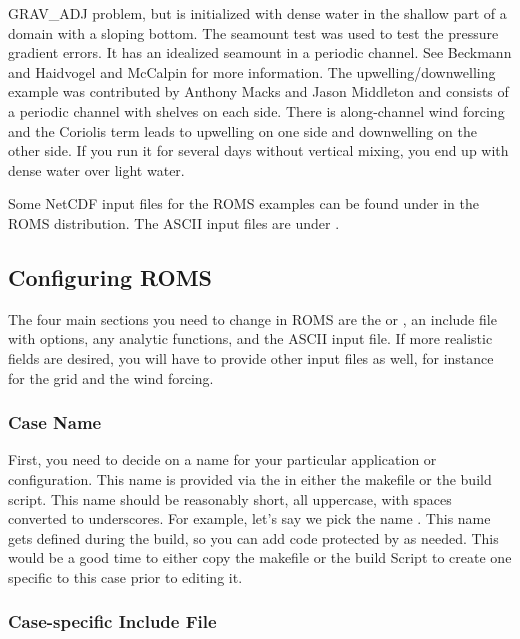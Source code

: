 \begin{klist}
 GRAV\_ADJ problem, but is initialized with dense water in the shallow
part of a domain with a sloping bottom.
      The seamount test was used to test the pressure
 gradient errors.  It has an idealized seamount in a periodic channel.
 See Beckmann and Haidvogel \cite{BH93} and McCalpin \cite{McCalpin94}
 for more information.
     The upwelling/downwelling example was
 contributed by Anthony Macks and Jason Middleton \cite{Macks93}
 and consists of a periodic channel with shelves on each side.
 There is along-channel wind forcing and the Coriolis term leads
 to upwelling on one side and downwelling on the other side. If
 you run it for several days without vertical mixing, you end up with
 dense water over light water.
\end{klist}
Some NetCDF input files for the ROMS examples can be found under
 in the ROMS distribution. The ASCII input files are
under .

\subsection{Configuring ROMS}
\label{User}

The four main sections you need to change in ROMS are the 
or , an include file with  options, any
analytic functions, and the ASCII input file. If more realistic fields
are desired, you will have to provide other input files as well, for
instance for the grid and the wind forcing.

\subsubsection{Case Name}

First, you need to decide on a name for your particular application or
configuration. This name is provided via the  in
either the makefile or the build script. This name should be reasonably
short, all uppercase, with spaces converted to underscores. For example,
let's say we pick the name . This name gets defined
during the build, so you can add code protected by  as needed. This would be a good time to either copy the
makefile or the build Script to create one specific to this case prior
to editing it.

\subsubsection{ Case-specific Include File}

